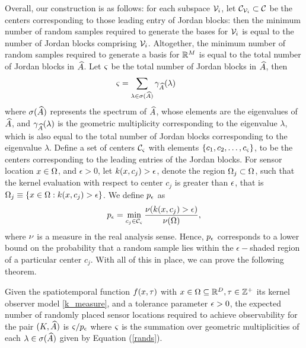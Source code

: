 Overall, our construction is as follows: for each subspace $ \mathcal{V}_i $, let $ \mathcal{C}_{\mathcal{V}_i} \subset \mathcal{C} $ be the centers corresponding to those leading entry of Jordan blocks: then the minimum number of random samples required to generate the bases for $ \mathcal{V}_i $ is equal to the number of Jordan blocks comprising $ \mathcal{V}_i $. Altogether, the minimum number of random samples required to generate a basis for $ \mathbb{R}^M $ is equal to the total number of Jordan blocks in $ \widehat{A} $. Let $ \varsigma $ be the total number of Jordan blocks in $ \widehat{A}  $, then
\begin{equation}\label{rands}
\rands = \sum_{\lambda \in \sigma(\dualopApprox)} \gamma_{\dualopApprox}(\lambda) \qquad %
\end{equation}
where $\sigma(\widehat{A}) $ represents the spectrum of $ \widehat{A} $, whose elements are the eigenvalues of $ \widehat{A} $, and $ \gamma_{\widehat{A}}(\lambda) $ is the geometric multiplicity corresponding to the eigenvalue $ \lambda $, which is also equal to the total number of Jordan blocks corresponding to the eigenvalue $ \lambda $. Define a set of centers $ \mathcal{C}_\varsigma $ with elements $ \{c_1, c_2,\dots, c_\varsigma\} $, to be the centers corresponding to the leading entries of  the Jordan blocks.
For sensor location $x\in\Omega$, and $ \epsilon > 0 $, let $k(x, c_j) > \epsilon$, denote the region $\Omega_j\subset\Omega$, such that the kernel evaluation with respect to center $c_j$ is greater than $\epsilon$, that is $ \Omega_j \equiv \{x\in \Omega:k(x, c_j) > \epsilon\} $. We define
$ p_{\epsilon} $ as
\begin{equation}\label{ppp}
p_{\e} = \min_{c_j \in \shCent_\rands} \frac{\measure(\kernel(x, c_j) > \epsilon)}{\measure(\dom)},
\end{equation}
where $\nu$ is a measure in the real analysis sense. Hence, $p_{\epsilon}$ corresponds to a lower bound on the probability that a random sample lies within the $ \epsilon-$shaded region of a particular center $ c_j$. With all of this in place, we can prove the following theorem. 
\begin{theorem}\label{thm:r1}
	Given the spatiotemporal function $ f(x,\tau) $ with $ x \in \Omega \subseteq  \mathbb{R}^{D}, \tau\in \mathbb{Z}^+  $ its kernel observer model \eqref{k_measure}, and a tolerance parameter $\epsilon>0$, the expected number of randomly placed sensor locations required to achieve observability for the pair $ (K,\widehat{A}) $ is $ \varsigma/{p_{\epsilon}} $ where $ \varsigma $ is the summation over geometric multiplicities of each $ \lambda \in \sigma(\widehat{A}) $  given by Equation (\ref{rands}).
\end{theorem}
